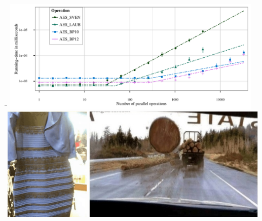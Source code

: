 \documentclass[landscape,footrule]{foils}
\begin{document}

\enlargethispage{3cm}
\begin{tabbing}
 \hspace*{2cm}\=\hspace*{10cm}\=\kill
   \> \includegraphics[height = 5.5cm, trim=2.5cm 0cm 3.8cm 0cm, clip]{aes-full-time}
   \> \includegraphics[height = 5.5cm, trim=0cm 0cm 0cm 0cm, clip]{the-dress}
\hspace*{0.15cm}
\includegraphics[height = 5.5cm, trim=4cm 0cm 4cm 0cm, clip]{logs-falling}\\


\end{tabbing}
\end{document}
